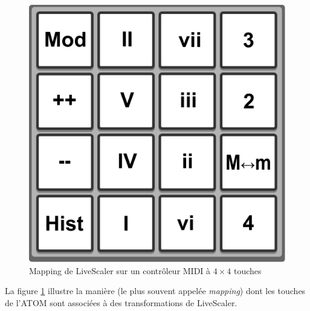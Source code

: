 \begin{figure}[htbp]
  \centering
  \includegraphics[width=\columnwidth]{Figures/Pads-config.pdf}
  \caption{Mapping de LiveScaler sur un contrôleur MIDI à $4\times 4$ touches\label{fig:mapping-ATOM}}
\end{figure}

La figure \ref{fig:mapping-ATOM} illustre la manière (le plus souvent appelée \emph{mapping}) dont les touches de l'ATOM sont associées à des transformations de LiveScaler.


